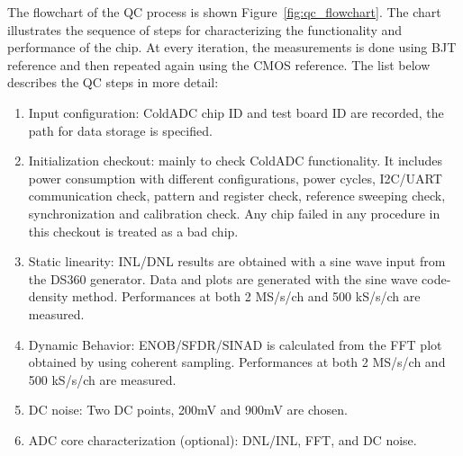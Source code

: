 The flowchart of the QC process is shown Figure~\ref{fig:qc_flowchart}.  The chart illustrates the sequence of steps for characterizing 
the functionality and performance of the chip. At every iteration, the measurements is done using BJT reference and then repeated 
again using the CMOS reference. 
The list below describes the QC steps in more detail: 
\begin{enumerate}
\item Input configuration: ColdADC chip ID and test board ID are recorded, the path for data storage is specified. 
\item Initialization checkout: mainly to check ColdADC functionality. It includes power consumption with different 
configurations, power cycles, I2C/UART communication check, pattern and register check, reference sweeping check, 
synchronization and calibration check. Any chip failed in any procedure in this checkout is treated as a bad chip. 
\item  Static linearity: INL/DNL results are obtained with a sine wave input from the DS360 generator. Data and plots 
are generated with the sine wave code-density method. Performances at both 2 MS/s/ch and 500 kS/s/ch are measured.
\item Dynamic Behavior: ENOB/SFDR/SINAD is calculated from the FFT plot obtained by using coherent sampling. 
Performances at both 2 MS/s/ch and 500 kS/s/ch are measured. 
\item DC noise: Two DC points, 200mV and 900mV are chosen.
\item ADC core characterization (optional): DNL/INL, FFT, and DC noise. 
\end{enumerate}

